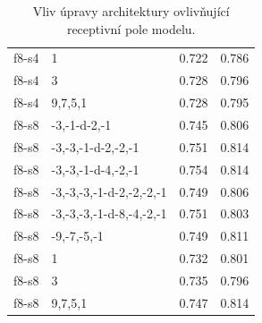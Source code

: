 \begin{table}[h!]
\begin{tabular}{llrr}
      f8-s4 &                         1 & 0.722 & 0.786 \\
      f8-s4 &                         3 & 0.728 & 0.796 \\
      f8-s4 &                   9,7,5,1 & 0.728 & 0.795 \\
      f8-s8 &              -3,-1-d-2,-1 & 0.745 & 0.806 \\
      f8-s8 &        -3,-3,-1-d-2,-2,-1 & 0.751 & 0.814 \\
      f8-s8 &        -3,-3,-1-d-4,-2,-1 & 0.754 & 0.814 \\
      f8-s8 &  -3,-3,-3,-1-d-2,-2,-2,-1 & 0.749 & 0.806 \\
      f8-s8 &  -3,-3,-3,-1-d-8,-4,-2,-1 & 0.751 & 0.803 \\
      f8-s8 &               -9,-7,-5,-1 & 0.749 & 0.811 \\
      f8-s8 &                         1 & 0.732 & 0.801 \\
      f8-s8 &                         3 & 0.735 & 0.796 \\
      f8-s8 &                   9,7,5,1 & 0.747 & 0.814 \\
\bottomrule
\end{tabular}

\caption{Vliv úpravy architektury ovlivňující receptivní pole modelu.}\label{tab:spectrogram_ctx_archs}
\end{table}

